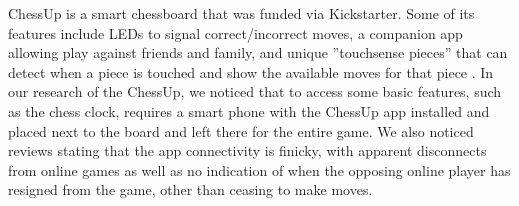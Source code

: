 \documentclass[11pt,journal]{IEEEtran}
\begin{document}



ChessUp is a smart chessboard that was funded via Kickstarter. Some of its features include LEDs to signal correct/incorrect moves, a companion app allowing play against friends and family, and unique ''touchsense pieces'' that can detect when a piece is touched and show the available moves for that piece \cite{chessup}. In our research of the ChessUp, we noticed that to access some basic features, such as the chess clock, requires a smart phone with the ChessUp app installed and placed next to the board and left there for the entire game. We also noticed reviews stating that the app connectivity is finicky, with apparent disconnects from online games as well as no indication of when the opposing online player has resigned from the game, other than ceasing to make moves.
\end{document}
